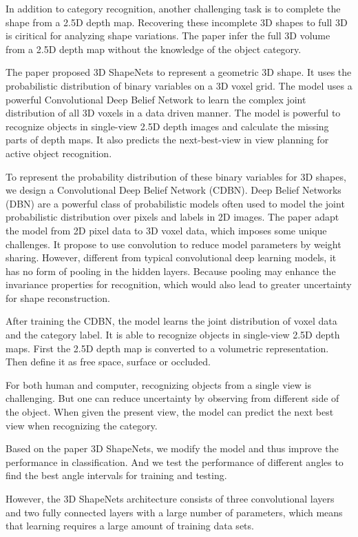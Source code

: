 \documentclass[11pt,journal,compsoc]{IEEEtran}
\begin{document}
  In addition to category recognition, another challenging task is to complete the shape from a 2.5D depth map. Recovering these incomplete 3D shapes to full 3D is ciritical for analyzing shape variations. The paper infer the full 3D volume from a 2.5D depth map without the knowledge of the object category.   
  
  The paper proposed 3D ShapeNets to represent a geometric 3D shape. It uses the probabilistic distribution of binary variables on a 3D voxel grid. The model uses a powerful Convolutional Deep Belief Network to learn the complex joint distribution of all 3D voxels in a data driven manner. The model is powerful to recognize objects in single-view 2.5D depth images and calculate the missing parts of depth maps. It also predicts the next-best-view in view planning for active object recognition. 
  
  To represent the probability distribution of these binary variables for 3D shapes, we design a Convolutional Deep Belief Network (CDBN). Deep Belief Networks (DBN) are a powerful class of probabilistic models often used to model the joint probabilistic distribution over pixels and
  labels in 2D images. The paper adapt the model from 2D pixel data to 3D voxel data, which imposes some unique challenges. It propose to use convolution to reduce model parameters by weight sharing. However, different from typical convolutional deep learning models, it has no form of pooling in the hidden layers. Because pooling may enhance the invariance properties for recognition, which would also lead to greater uncertainty for shape reconstruction.
  
  After training the CDBN, the model learns the joint distribution of voxel data and the category label. It is able to recognize objects in single-view 2.5D depth maps. First the 2.5D depth map is converted to a volumetric representation. Then define it as free space, surface or occluded.

  For both human and computer, recognizing objects from a single view is challenging. But one can reduce uncertainty by observing from different side of the object. When given the present view, the model can predict the next best view when recognizing the category. 

  Based on the paper 3D ShapeNets, we modify the model and thus improve the performance in classification. And we test the performance of different angles to find the best angle intervals for training and testing. 
  
  However, the 3D ShapeNets architecture consists of three convolutional layers and two fully connected layers with a large number of parameters, which means that learning requires a large amount of training data sets.
\end{document}
